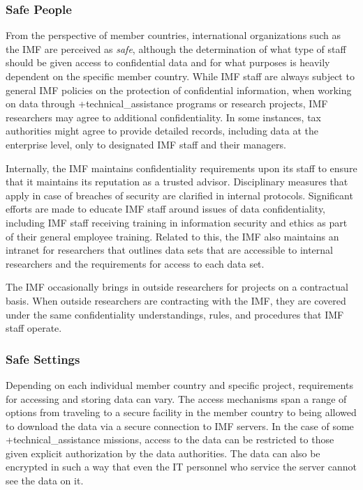 \documentclass[
]{WileySix}
\begin{document}
\hypertarget{safe-people-8}{%
\subsubsection{Safe People}\label{safe-people-8}}

From the perspective of member countries, international organizations such as the IMF are perceived as \emph{safe}, although the determination of what type of staff should be given access to confidential data and for what purposes is heavily dependent on the specific member country. While IMF staff are always subject to general IMF policies on the protection of confidential information, when working on data through +technical\_assistance\textbar{} programs or research projects, IMF researchers may agree to additional confidentiality. In some instances, tax authorities might agree to provide detailed records, including data at the enterprise level, only to designated IMF staff and their managers.

Internally, the IMF maintains confidentiality requirements upon its staff to ensure that it maintains its reputation as a trusted advisor. Disciplinary measures that apply in case of breaches of security are clarified in internal protocols. Significant efforts are made to educate IMF staff around issues of data confidentiality, including IMF staff receiving training in information security and ethics as part of their general employee training. Related to this, the IMF also maintains an intranet for researchers that outlines data sets that are accessible to internal researchers and the requirements for access to each data set.

The IMF occasionally brings in outside researchers for projects on a contractual basis. When outside researchers are contracting with the IMF, they are covered under the same confidentiality understandings, rules, and procedures that IMF staff operate.

\hypertarget{safe-settings-8}{%
\subsubsection{Safe Settings}\label{safe-settings-8}}

Depending on each individual member country and specific project, requirements for accessing and storing data can vary. The access mechanisms span a range of options from traveling to a secure facility in the member country to being allowed to download the data via a secure connection to IMF servers. In the case of some +technical\_assistance\textbar{} missions, access to the data can be restricted to those given explicit authorization by the data authorities. The data can also be encrypted in such a way that even the IT personnel who service the server cannot see the data on it.
\end{document}
